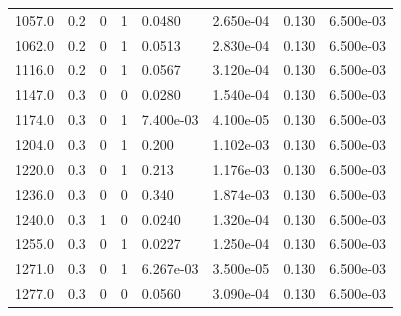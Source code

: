 \documentclass[preview]{standalone}
\begin{document}
{{{\begin{tabular}{L{1.2cm}C{1.2cm} C{0.3cm}C{0.5cm} C{1.4cm}C{1.4cm} C{1.4cm}C{1.4cm}}
  1057.0  &   0.2  & 0     &  1 &  0.0480  & 2.650e-04  & 0.130 &  6.500e-03   \\ 
  1062.0  &   0.2  & 0     &  1 &  0.0513  & 2.830e-04  & 0.130 &  6.500e-03   \\ 
  1116.0  &   0.2  & 0     &  1 &  0.0567  & 3.120e-04  & 0.130 &  6.500e-03   \\ 
  1147.0  &   0.3  & 0     &  0 &  0.0280  & 1.540e-04  & 0.130 &  6.500e-03   \\ 
  1174.0  &   0.3  & 0     &  1 &  7.400e-03  & 4.100e-05  & 0.130 &  6.500e-03   \\ 
  1204.0  &   0.3  & 0     &  1 &  0.200  & 1.102e-03  & 0.130 &  6.500e-03   \\ 
  1220.0  &   0.3  & 0     &  1 &  0.213  & 1.176e-03  & 0.130 &  6.500e-03   \\ 
  1236.0  &   0.3  & 0     &  0 &  0.340  & 1.874e-03  & 0.130 &  6.500e-03   \\ 
  1240.0  &   0.3  & 1     &  0 &  0.0240  & 1.320e-04  & 0.130 &  6.500e-03   \\ 
  1255.0  &   0.3  & 0     &  1 &  0.0227  & 1.250e-04  & 0.130 &  6.500e-03   \\ 
  1271.0  &   0.3  & 0     &  1 &  6.267e-03  & 3.500e-05  & 0.130 &  6.500e-03   \\ 
  1277.0  &   0.3  & 0     &  0 &  0.0560  & 3.090e-04  & 0.130 &  6.500e-03   \\ 
\hline 
\end{tabular} 

}}}
\end{document}
